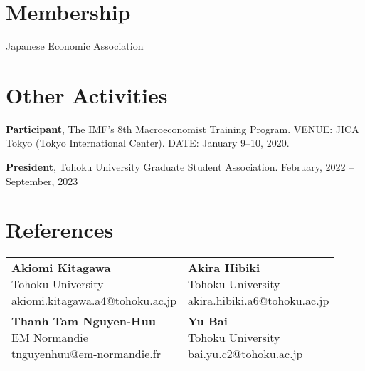 \documentclass[12pt]{article}
\begin{document}
\section{Membership}

Japanese Economic Association

\section{Other Activities}

\textbf{Participant}, The IMF's 8th Macroeconomist Training Program. VENUE: JICA Tokyo (Tokyo International Center). DATE: January 9--10, 2020.

\textbf{President}, Tohoku University Graduate Student Association. February, 2022 -- September, 2023

\section{\sc References}

\begin{center}
    \begin{tabular}{p{7cm} p{7cm}}
        \parbox[t]{7cm}{
            {\bf Akiomi Kitagawa} \\ 
            Tohoku University \\
            akiomi.kitagawa.a4@tohoku.ac.jp
        } 
        
        & 
        
        \parbox[t]{7cm}{
        {\bf Akira Hibiki} \\ 
        Tohoku University \\
        akira.hibiki.a6@tohoku.ac.jp
        } 
        
        \\
        
        \vspace{1em}
        \parbox[t]{7cm}{
        {\bf Thanh Tam Nguyen-Huu} \\ 
        EM Normandie  \\
        tnguyenhuu@em-normandie.fr
        }
        
        &
        
        \vspace{1em}
        \parbox[t]{7cm}{
        {\bf Yu Bai} \\ 
        Tohoku University \\
        bai.yu.c2@tohoku.ac.jp
        }
    \end{tabular}
\end{center}
\end{document}
